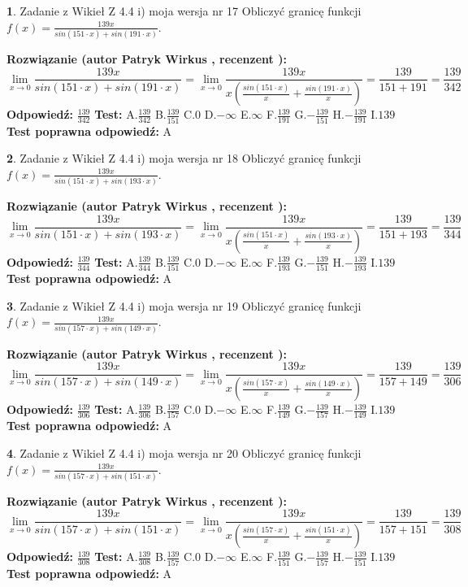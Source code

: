 \documentclass[12pt, a4paper]{article}
\theoremstyle{definition} %
\newtheorem{zad}{}
\newcommand{\zadStart}[1]{\begin{zad}#1\newline}
\newcommand{\zadStop}{\end{zad}}
\newcommand{\rozwStart}[2]{\noindent \textbf{Rozwiązanie (autor #1 , recenzent #2): }\newline}
\newcommand{\rozwStop}{\newline}
\newcommand{\odpStart}{\noindent \textbf{Odpowiedź:}\newline}
\newcommand{\odpStop}{\newline}
\newcommand{\testStart}{\noindent \textbf{Test:}\newline}
\newcommand{\testStop}{\newline}
\newcommand{\kluczStart}{\noindent \textbf{Test poprawna odpowiedź:}\newline}
\newcommand{\kluczStop}{\newline}
\begin{document}
\zadStart{Zadanie z Wikieł Z 4.4 i) moja wersja nr 17}
Obliczyć granicę funkcji $f(x)=\frac{139x}{sin(151\cdot x) +sin(191\cdot x)}$.
\zadStop
\rozwStart{Patryk Wirkus}{}
$$\lim\limits_{x\to 0}\frac{139x}{sin(151\cdot x) +sin(191\cdot x)}=\lim\limits_{x\to 0}\frac{139x}{x(\frac{sin(151\cdot x)}{x}+\frac{sin(191\cdot x)}{x})}=\frac{139}{151+191} = \frac{139}{342}$$
\rozwStop
\odpStart
$\frac{139}{342}$
\odpStop
\testStart
A.$\frac{139}{342}$
B.$\frac{139}{151}$
C.$0$
D.$-\infty$
E.$\infty$
F.$\frac{139}{191}$
G.$-\frac{139}{151}$
H.$-\frac{139}{191}$
I.$139$
\testStop
\kluczStart
A
\kluczStop



\zadStart{Zadanie z Wikieł Z 4.4 i) moja wersja nr 18}
Obliczyć granicę funkcji $f(x)=\frac{139x}{sin(151\cdot x) +sin(193\cdot x)}$.
\zadStop
\rozwStart{Patryk Wirkus}{}
$$\lim\limits_{x\to 0}\frac{139x}{sin(151\cdot x) +sin(193\cdot x)}=\lim\limits_{x\to 0}\frac{139x}{x(\frac{sin(151\cdot x)}{x}+\frac{sin(193\cdot x)}{x})}=\frac{139}{151+193} = \frac{139}{344}$$
\rozwStop
\odpStart
$\frac{139}{344}$
\odpStop
\testStart
A.$\frac{139}{344}$
B.$\frac{139}{151}$
C.$0$
D.$-\infty$
E.$\infty$
F.$\frac{139}{193}$
G.$-\frac{139}{151}$
H.$-\frac{139}{193}$
I.$139$
\testStop
\kluczStart
A
\kluczStop



\zadStart{Zadanie z Wikieł Z 4.4 i) moja wersja nr 19}
Obliczyć granicę funkcji $f(x)=\frac{139x}{sin(157\cdot x) +sin(149\cdot x)}$.
\zadStop
\rozwStart{Patryk Wirkus}{}
$$\lim\limits_{x\to 0}\frac{139x}{sin(157\cdot x) +sin(149\cdot x)}=\lim\limits_{x\to 0}\frac{139x}{x(\frac{sin(157\cdot x)}{x}+\frac{sin(149\cdot x)}{x})}=\frac{139}{157+149} = \frac{139}{306}$$
\rozwStop
\odpStart
$\frac{139}{306}$
\odpStop
\testStart
A.$\frac{139}{306}$
B.$\frac{139}{157}$
C.$0$
D.$-\infty$
E.$\infty$
F.$\frac{139}{149}$
G.$-\frac{139}{157}$
H.$-\frac{139}{149}$
I.$139$
\testStop
\kluczStart
A
\kluczStop



\zadStart{Zadanie z Wikieł Z 4.4 i) moja wersja nr 20}
Obliczyć granicę funkcji $f(x)=\frac{139x}{sin(157\cdot x) +sin(151\cdot x)}$.
\zadStop
\rozwStart{Patryk Wirkus}{}
$$\lim\limits_{x\to 0}\frac{139x}{sin(157\cdot x) +sin(151\cdot x)}=\lim\limits_{x\to 0}\frac{139x}{x(\frac{sin(157\cdot x)}{x}+\frac{sin(151\cdot x)}{x})}=\frac{139}{157+151} = \frac{139}{308}$$
\rozwStop
\odpStart
$\frac{139}{308}$
\odpStop
\testStart
A.$\frac{139}{308}$
B.$\frac{139}{157}$
C.$0$
D.$-\infty$
E.$\infty$
F.$\frac{139}{151}$
G.$-\frac{139}{157}$
H.$-\frac{139}{151}$
I.$139$
\testStop
\kluczStart
A
\kluczStop
\end{document}
